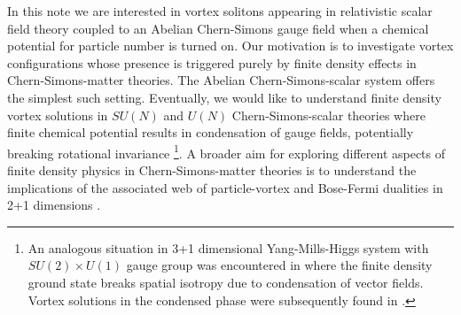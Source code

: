 In this note we are interested in vortex solitons appearing in  relativistic scalar field theory coupled to an Abelian Chern-Simons gauge field when a chemical potential for particle number is turned on. Our motivation is to investigate vortex configurations whose presence is triggered purely by finite density effects in Chern-Simons-matter theories. The Abelian Chern-Simons-scalar system offers the simplest  such setting. Eventually, we would like to understand finite density vortex solutions in $SU(N)$ and $U(N)$ Chern-Simons-scalar theories where  finite chemical potential results in condensation of gauge fields, potentially breaking rotational invariance \cite{Kumar:2018nkf}\footnote{An analogous situation in 3+1 dimensional Yang-Mills-Higgs system with $SU(2)\times U(1)$ gauge group was encountered in \cite{Gusynin2004} where the finite density ground state breaks spatial isotropy due to condensation of vector fields.  Vortex solutions in the condensed phase were subsequently found in \cite{hep-ph/0512203}.}.
A broader aim for exploring different aspects of finite density physics in Chern-Simons-matter theories is to understand the implications of the associated web \cite{Seiberg:2016gmd, Karch:2016sxi, 1606.01912} of particle-vortex and Bose-Fermi dualities in 2+1 dimensions  
\cite{1110.4386, Aharony:2011jz, Aharony:2012nh, 1211.4843, Jain:2013py, Jain:2013gza, Takimi:2013zca, Aharony:2015mjs, Geracie:2015drf}.

